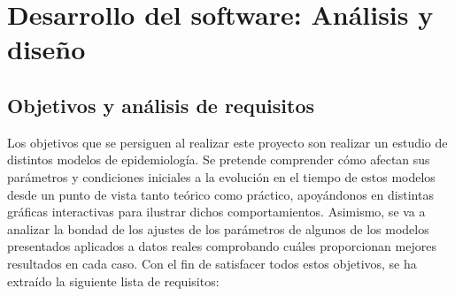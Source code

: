 
\chapter{Desarrollo del software: Análisis y diseño}

\section{Objetivos y análisis de requisitos}

Los objetivos que se persiguen al realizar este proyecto son realizar un estudio de distintos modelos de epidemiología. Se pretende comprender cómo afectan sus parámetros y condiciones iniciales a la evolución en el tiempo de estos modelos desde un punto de vista tanto teórico como práctico, apoyándonos en distintas gráficas interactivas para ilustrar dichos comportamientos. Asimismo, se va a analizar la bondad de los ajustes de los parámetros de algunos de los modelos presentados aplicados a datos reales comprobando cuáles proporcionan mejores resultados en cada caso. Con el fin de satisfacer todos estos objetivos, se ha extraído la siguiente lista de requisitos:

